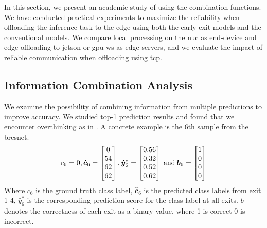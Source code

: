 In this section, we present an academic study of using the combination functions. We have conducted practical experiments to maximize the reliability when offloading the inference task to the edge using both the early exit models and the conventional models. We compare local processing on the \gls{nuc} as end-device and edge offloading to \gls{jetson} or \gls{gpu-ws} as edge servers, and we evaluate the impact of reliable communication when offloading using \gls{tcp}. 

\subsection{Information Combination Analysis}

We examine the possibility of combining information from multiple predictions to improve accuracy. We studied top-1 prediction results and found that we encounter overthinking as in \cite{kaya_shallow-deep_nodate}. A concrete example is the 6th sample from the \gls{bresnet}.
\begin{align*}
c_6=0,
\bm{\hat{c}}_{6}=
\begin{bmatrix}
0 \\
54 \\
62 \\
62
\end{bmatrix},
\bm{\hat{y}}^{*}_{6}=
\begin{bmatrix}
0.56 \\
0.32 \\
0.52 \\
0.62
\end{bmatrix} \text{\:and\:}
\bm{b}_{6}=
\begin{bmatrix}
1 \\
0 \\
0 \\
0
\end{bmatrix}
\end{align*}
Where $ c_6 $ is the ground truth class label, $ \bm{\hat{c}}_6 $ is the predicted class labels from exit 1-4, $ \hat{y}^*_6 $ is the corresponding prediction score for the class label at all exits. $ b $ denotes the correctness of each exit as a binary value, where 1 is correct 0 is incorrect.

